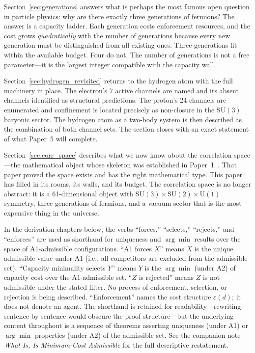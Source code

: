 \documentclass[11pt]{article}
\newcommand{\SU}{\mathrm{SU}}
\newcommand{\U}{\mathrm{U}}
\begin{document}
Section~\ref{sec:generations} answers what is perhaps the most famous open question in particle physics: why are there exactly three generations of fermions?  The answer is a capacity ladder.  Each generation costs enforcement resources, and the cost grows \emph{quadratically} with the number of generations because every new generation must be distinguished from all existing ones.  Three generations fit within the available budget.  Four do not.  The number of generations is not a free parameter---it is the largest integer compatible with the capacity wall.

Section~\ref{sec:hydrogen_revisited} returns to the hydrogen atom with the full machinery in place.  The electron's 7 active channels are named and its absent channels identified as structural predictions.  The proton's 24 channels are enumerated and confinement is located precisely as non-closure in the $\SU(3)$ baryonic sector.  The hydrogen atom as a two-body system is then described as the combination of both channel sets.  The section closes with an exact statement of what Paper~5 will complete.

Section~\ref{sec:corr_space} describes what we now know about the correlation space---the mathematical object whose skeleton was established in Paper~1~\cite{BrookePaper1}.  That paper proved the space exists and has the right mathematical type.  This paper has filled in its rooms, its walls, and its budget.  The correlation space is no longer abstract: it is a 61-dimensional object with $\SU(3) \times \SU(2) \times \U(1)$ symmetry, three generations of fermions, and a vacuum sector that is the most expensive thing in the universe.



\begin{tcolorbox}[apfbox, title={Descriptive-framing convention (read once, applies throughout)}]
In the derivation chapters below, the verbs ``forces,'' ``selects,'' ``rejects,'' and ``enforces'' are used as shorthand for uniqueness and $\arg\min$ results over the space of A1-admissible configurations.  ``A1 forces $X$'' means $X$ is the unique admissible value under A1 (i.e., all competitors are excluded from the admissible set).  ``Capacity minimality selects $Y$'' means $Y$ is the $\arg\min$ (under A2) of capacity cost over the A1-admissible set.  ``$Z$ is rejected'' means $Z$ is not admissible under the stated filter.  No process of enforcement, selection, or rejection is being described.  ``Enforcement'' names the cost structure $\varepsilon(d)$; it does not denote an agent.  The shorthand is retained for readability---rewriting sentence by sentence would obscure the proof structure---but the underlying content throughout is a sequence of theorems asserting uniqueness (under A1) or $\arg\min$ properties (under A2) of the admissible set.  See the companion note \emph{What Is, Is Minimum-Cost Admissible} for the full descriptive restatement.
\end{tcolorbox}
\end{document}
